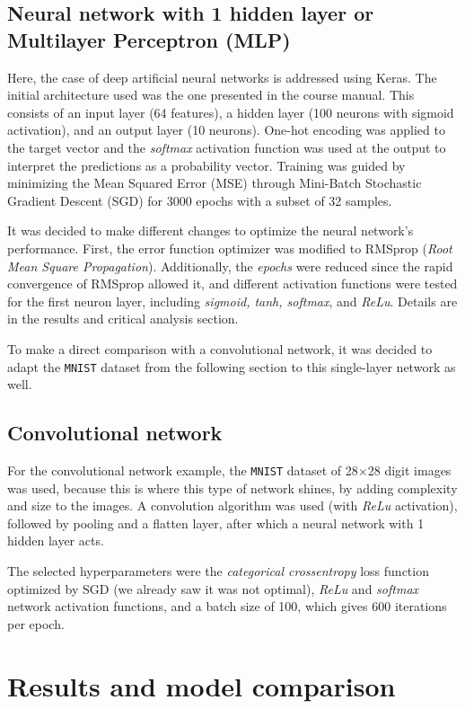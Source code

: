 \documentclass[11pt,a4paper]{article}
\begin{document}
\subsection{Neural network with 1 hidden layer or Multilayer Perceptron (MLP)}
Here, the case of deep artificial neural networks is addressed using Keras. The initial architecture used was the one presented in the course manual. This consists of an input layer (64 features), a hidden layer (100 neurons with sigmoid activation), and an output layer (10 neurons). One-hot encoding was applied to the target vector and the \textit{softmax} activation function was used at the output to interpret the predictions as a probability vector. Training was guided by minimizing the Mean Squared Error (MSE) through Mini-Batch Stochastic Gradient Descent (SGD) for 3000 epochs with a subset of 32 samples.

It was decided to make different changes to optimize the neural network's performance. First, the error function optimizer was modified to RMSprop (\textit{Root Mean Square Propagation}). Additionally, the \textit{epochs} were reduced since the rapid convergence of RMSprop allowed it, and different activation functions were tested for the first neuron layer, including \textit{sigmoid, tanh, softmax}, and \textit{ReLu}. Details are in the results and critical analysis section.

To make a direct comparison with a convolutional network, it was decided to adapt the \texttt{MNIST} dataset from the following section to this single-layer network as well.

\subsection{Convolutional network}

For the convolutional network example, the \texttt{MNIST} dataset of 28$\times$28 digit images was used, because this is where this type of network shines, by adding complexity and size to the images. A convolution algorithm was used (with \textit{ReLu} activation), followed by pooling and a flatten layer, after which a neural network with 1 hidden layer acts.

The selected hyperparameters were the \textit{categorical crossentropy} loss function optimized by SGD (we already saw it was not optimal), \textit{ReLu} and \textit{softmax} network activation functions, and a batch size of 100, which gives 600 iterations per epoch.

\section{Results and model comparison}
\end{document}
